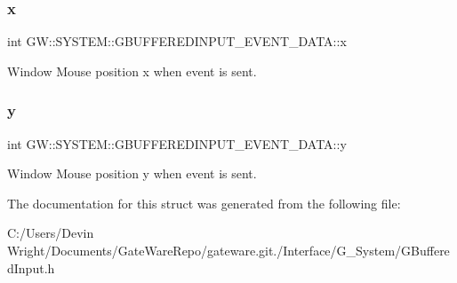 \subsubsection{\texorpdfstring{x}{x}}
{\footnotesize\ttfamily int G\+W\+::\+S\+Y\+S\+T\+E\+M\+::\+G\+B\+U\+F\+F\+E\+R\+E\+D\+I\+N\+P\+U\+T\+\_\+\+E\+V\+E\+N\+T\+\_\+\+D\+A\+T\+A\+::x}

Window Mouse position x when event is sent. \mbox{\label{struct_g_w_1_1_s_y_s_t_e_m_1_1_g_b_u_f_f_e_r_e_d_i_n_p_u_t___e_v_e_n_t___d_a_t_a_a68facd2e2754c908ecf8b8ef4ce34e08}} 
\subsubsection{\texorpdfstring{y}{y}}
{\footnotesize\ttfamily int G\+W\+::\+S\+Y\+S\+T\+E\+M\+::\+G\+B\+U\+F\+F\+E\+R\+E\+D\+I\+N\+P\+U\+T\+\_\+\+E\+V\+E\+N\+T\+\_\+\+D\+A\+T\+A\+::y}

Window Mouse position y when event is sent. 

The documentation for this struct was generated from the following file\+:\begin{DoxyCompactItemize}
\item 
C\+:/\+Users/\+Devin Wright/\+Documents/\+Gate\+Ware\+Repo/gateware.\+git./\+Interface/\+G\+\_\+\+System/G\+Buffered\+Input.\+h\end{DoxyCompactItemize}
